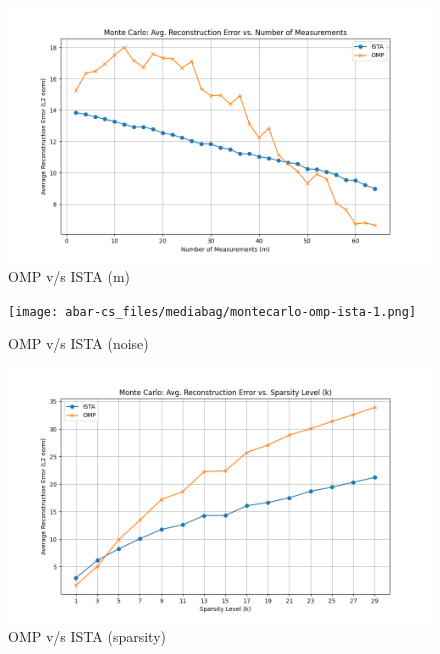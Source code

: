 \documentclass[
  letterpaper,
  DIV=11,
  numbers=noendperiod]{scrartcl}
\begin{document}
\begin{figure}[H]

{\centering \includegraphics[width=0.8\linewidth,height=\textheight,keepaspectratio]{abar-cs_files/mediabag/montecarlo-omp-ista-.png}

}

\caption{OMP v/s ISTA (m)}

\end{figure}%

\begin{figure}[H]

{\centering \texttt{[image: abar-cs\_files/mediabag/montecarlo-omp-ista-1.png]}

}

\caption{OMP v/s ISTA (noise)}

\end{figure}%

\begin{figure}[H]

{\centering \includegraphics[width=0.8\linewidth,height=\textheight,keepaspectratio]{abar-cs_files/mediabag/montecarlo-omp-ista-12.png}

}

\caption{OMP v/s ISTA (sparsity)}

\end{figure}%
\end{document}
